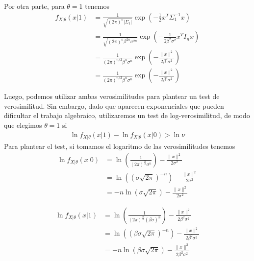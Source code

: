 \documentclass[
  11pt,
  letterpaper,
   addpoints,
   answers
  ]{exam}
\begin{document}
\begin{questions}
\begin{solution}
Por otra parte, para \(\theta = 1\) tenemos
\begin{align}
f_{X|\theta}(x|1) &= \frac{1}{\sqrt{(2\pi)^n |\Sigma_1|}} \exp\left( -\frac{1}{2} x^T \Sigma_1^{-1} x \right) \tag{17} \\
&= \frac{1}{\sqrt{(2\pi)^n \beta^{2n} \sigma^{2n}}} \exp\left( -\frac{1}{2 \beta^2 \sigma^2} x^T I_n x \right) \tag{18} \\
&= \frac{1}{(2\pi)^{n/2} \beta^n \sigma^n} \exp\left( -\frac{\|x\|^2}{2 \beta^2 \sigma^2} \right) \tag{19} \\
&= \frac{1}{(2\pi)^{n/2} \beta^n \sigma^n} \exp\left( -\frac{\|x\|^2}{2 \beta^2 \sigma^2} \right) \tag{20}
\end{align}

Luego, podemos utilizar ambas verosimilitudes para plantear un test de verosimilitud. Sin embargo, dado que aparecen exponenciales que pueden dificultar el trabajo algebraico, utilizaremos un test de log-verosimilitud, de modo que elegimos \(\theta = 1\) si
\begin{align}
\ln f_{X|\theta}(x|1) - \ln f_{X|\theta}(x|0) > \ln \nu \tag{21}
\end{align}
Para plantear el test, si tomamos el logaritmo de las verosimilitudes tenemos
\begin{align}
\ln f_{X|\theta}(x|0) &= \ln \left( \frac{1}{(2\pi)^{\frac{n}{2}} \sigma^n} \right) - \frac{\|x\|^2}{2\sigma^2} \\
&= \ln \left( \left( \sigma \sqrt{2\pi} \right)^{-n} \right) - \frac{\|x\|^2}{2\sigma^2} \\
&= -n \ln (\sigma \sqrt{2\pi}) - \frac{\|x\|^2}{2\sigma^2}
\end{align}

\begin{align}
\ln f_{X|\theta}(x|1) &= \ln \left( \frac{1}{(2\pi)^{\frac{n}{2}} (\beta \sigma)^n} \right) - \frac{\|x\|^2}{2 \beta^2 \sigma^2} \\
&= \ln \left( \left( \beta \sigma \sqrt{2\pi} \right)^{-n} \right) - \frac{\|x\|^2}{2 \beta^2 \sigma^2} \\
&= -n \ln (\beta \sigma \sqrt{2\pi}) - \frac{\|x\|^2}{2 \beta^2 \sigma^2}
\end{align}


\end{solution}
\end{questions}
\end{document}

